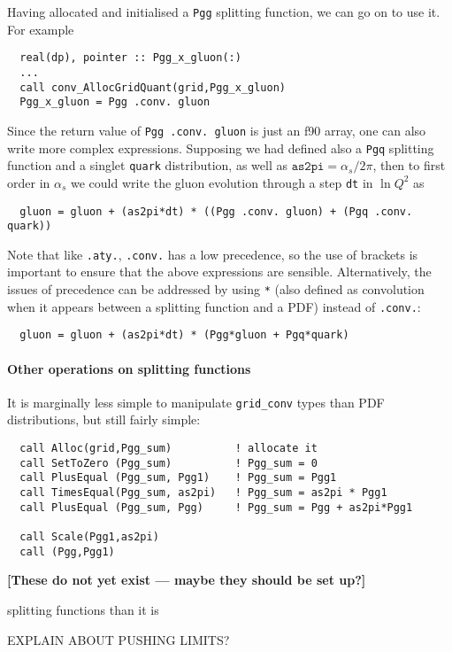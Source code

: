 \documentclass[12pt]{article}
\newcommand{\as}{\alpha_s}
\newcommand{\comment}[1]{\textbf{[#1]}}
\begin{document}
Having allocated and initialised a \texttt{Pgg} splitting function, we
can go on to use it. For example 
\begin{verbatim}
  real(dp), pointer :: Pgg_x_gluon(:)
  ...
  call conv_AllocGridQuant(grid,Pgg_x_gluon)
  Pgg_x_gluon = Pgg .conv. gluon
\end{verbatim}  
Since the return value of \texttt{Pgg .conv.\ gluon} is just an f90
array, one can also write more complex expressions. Supposing we had
defined also a \texttt{Pgq} splitting function and a singlet
\texttt{quark} distribution, as well as $\texttt{as2pi} = \as/2\pi$,
then to first order in $\as$ we could write the gluon evolution
through a step \texttt{dt} in $\ln Q^2$ as
\begin{verbatim}
  gluon = gluon + (as2pi*dt) * ((Pgg .conv. gluon) + (Pgq .conv. quark))
\end{verbatim}
Note that like \texttt{.aty.}, \texttt{.conv.} has a low precedence,
so the use of brackets is important to ensure that the above
expressions are sensible. Alternatively, the issues of precedence can
be addressed by using \texttt{*} (also defined as convolution when it
appears between a splitting function and a PDF) instead of
\texttt{.conv.}:
\begin{verbatim}
  gluon = gluon + (as2pi*dt) * (Pgg*gluon + Pgq*quark)
\end{verbatim}


\paragraph{Other operations on splitting functions}
%
It is marginally less simple to manipulate \texttt{grid\_conv} types
than PDF distributions, but still fairly simple:



\begin{verbatim}
  call Alloc(grid,Pgg_sum)          ! allocate it
  call SetToZero (Pgg_sum)          ! Pgg_sum = 0
  call PlusEqual (Pgg_sum, Pgg1)    ! Pgg_sum = Pgg1
  call TimesEqual(Pgg_sum, as2pi)   ! Pgg_sum = as2pi * Pgg1
  call PlusEqual (Pgg_sum, Pgg)     ! Pgg_sum = Pgg + as2pi*Pgg1

  call Scale(Pgg1,as2pi)
  call (Pgg,Pgg1)
\end{verbatim}

\comment{These do not yet exist --- maybe they should be set up?}

splitting functions than it is

EXPLAIN ABOUT PUSHING LIMITS?
\end{document}
